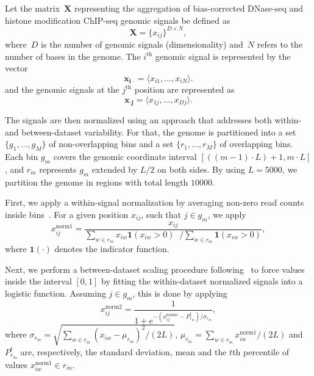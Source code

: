 Let the matrix~$\mathbf{X}$ representing the aggregation of bias-corrected DNase-seq and histone modification ChIP-seq genomic signals be defined as
\begin{equation}
  \label{eq:multivar.matrix}
  \mathbf{X} = {\{{x}_{ij}\}}^{D \times N},
\end{equation}
where~$ D $ is the number of genomic signals (dimensionality) and~$N$ refers to the number of bases in the genome. The $i^\text{th}$ genomic signal is represented by the vector
\begin{equation}
  \label{eq:multivar.matrix.i}
  \mathbf{{x}_{i\cdot}} = \langle{x}_{i1},...,{x}_{iN}\rangle.
\end{equation}
and the genomic signals at the $j^{\text{th}}$ position are represented as 
\begin{equation}
  \label{eq:multivar.matrix.j}
  \mathbf{{x}_{\cdot j}} = \langle{x}_{1j},...,{x}_{Dj}\rangle.
\end{equation}

The signals are then normalized using an approach that addresses both within- and between-dataset variability. For that, the genome is partitioned into a set $\{g_1,...,g_M\} $ of non-overlapping bins and a set $\{r_1,...,r_M\} $ of overlapping bins. Each bin $g_m$ covers the genomic coordinate interval $[((m-1) \cdot L )+1,m \cdot L]$, and $r_m$ represents $g_m$ extended by $L/2$ on both sides. By using $L=5000$, we partition the genome in regions with total length $10000$.

First, we apply a within-signal normalization by averaging non-zero read counts inside bins~\cite{boyle2011}. For a given position $x_{ij}$, such that $j \in g_m$, we apply
\begin{equation}
  \label{eq:norm1}
  x^{\text{norm1}}_{ij} = \frac{x_{ij}}{ 
                     \sum\limits_{w \in {r_m}} x_{iw} \mathbf{1}({x}_{iw}>0)  \;\; \Big/  
                     \sum\limits_{w \in {r_m}} \mathbf{1}(x_{iw}>0)
                     },
\end{equation}
where $ {\mathbf{1}}(\cdot) $ denotes the indicator function.

Next, we perform a between-dataset scaling procedure following~\cite{hon2009} to force values inside the interval $ [0,1] $ by fitting the within-dataset normalized signals into a logistic function. Assuming $j \in g_m$, this is done by applying
\begin{equation}
  \label{eq:norm2}
  {x}^{\text{norm2}}_{ij} = \frac{1}{1+e^{{-(x^{\text{norm1}}_{ij}-P^{t}_{r_m})}/{\sigma}_{{r_m}}}},
\end{equation}
where $\sigma_{r_m} = \sqrt{ \sum_{w \in r_m} (x_{iw} - \mu_{r_m})^2/(2L) }$, $\mu_{r_m}=  \sum_{w \in r_m}  {x}^{\text{norm1}}_{iw}/(2L)$  and $P^{t}_{r_m}$ are, respectively, the standard deviation, mean and the $t$th percentile of values $x^{\text{norm1}}_{iw} \in r_m$.

